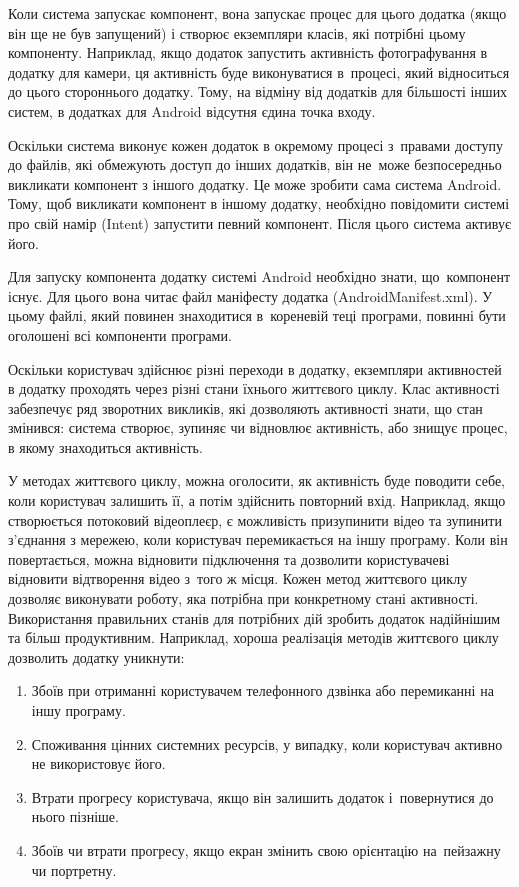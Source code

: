 \documentclass[../main.tex]{subfiles}
\begin{document}
Коли система запускає компонент, вона запускає процес для цього додатка (якщо він ще не був запущений) і створює екземпляри класів, які потрібні цьому компоненту. Наприклад, якщо додаток запустить активність фотографування в додатку для камери, ця активність буде виконуватися в~процесі, який відноситься до цього стороннього додатку. Тому, на відміну від додатків для більшості інших систем, в додатках для Android відсутня єдина точка входу.

Оскільки система виконує кожен додаток в окремому процесі з~правами доступу до файлів, які обмежують доступ до інших додатків, він не~може безпосередньо викликати компонент з іншого додатку. Це може зробити сама система Android. Тому, щоб викликати компонент в іншому додатку, необхідно повідомити системі про свій намір (Intent) запустити певний компонент. Після цього система активує його.

Для запуску компонента додатку системі Android необхідно знати, що~компонент існує. Для цього вона читає файл маніфесту додатка (AndroidManifest.xml). У цьому файлі, який повинен знаходитися в~кореневій теці програми, повинні бути оголошені всі компоненти програми.

Оскільки користувач здійснює різні переходи в додатку, екземпляри активностей в додатку проходять через різні стани їхнього життєвого циклу. Клас активності забезпечує ряд зворотних викликів, які дозволяють активності знати, що стан змінився: система створює, зупиняє чи відновлює активність, або знищує процес, в якому знаходиться активність.

У методах життєвого циклу, можна оголосити, як активність буде поводити себе, коли користувач залишить її, а потім здійснить повторний вхід. Наприклад, якщо створюється потоковий відеоплеєр, є можливість призупинити відео та зупинити з'єднання з мережею, коли користувач перемикається на іншу програму. Коли він повертається, можна відновити підключення та дозволити користувачеві відновити відтворення відео з~того ж місця. Кожен метод життєвого циклу дозволяє виконувати роботу, яка потрібна при конкретному стані активності. Використання правильних станів для потрібних дій зробить додаток надійнішим та більш продуктивним. Наприклад, хороша реалізація методів життєвого циклу дозволить додатку уникнути:

\begin{enumerate}
	\item Збоїв при отриманні користувачем телефонного дзвінка або перемиканні на іншу програму.
	\item Споживання цінних системних ресурсів, у випадку, коли користувач активно не використовує його.
	\item Втрати прогресу користувача, якщо він залишить додаток і~повернутися до нього пізніше.
	\item Збоїв чи втрати прогресу, якщо екран змінить свою орієнтацію на~пейзажну чи портретну.
\end{enumerate}
\end{document}
